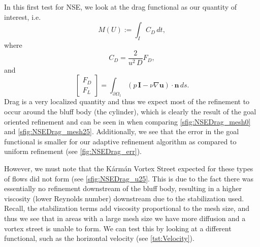 \begin{test} \label{tst:Drag}
    In this first test for NSE, we look at the drag functional as our quantity
    of interest, i.e.
    \begin{equation}
        M(U) := \int_I\! C_D\, dt,
        \label{eq:DragFunctional}
    \end{equation}
    where
    \begin{equation*}
        C_D = \frac{2}{u^2\, D}F_D,
    \end{equation*}
    and
    \begin{equation*}
        \begin{bmatrix} F_D \\ F_L \end{bmatrix} =
            \int_{\partial \Omega_1}\! (p\, \mathbf{I} - \nu \nabla
                \mathbf{u})\cdot \mathbf{n}\, ds.
    \end{equation*}
    Drag is a very localized quantity and thus we expect most of the refinement
    to occur around the bluff body (the cylinder), which is clearly the result
    of the goal oriented refinement and can be seen in when comparing
    \autoref{sfig:NSEDrag_mesh0} and \autoref{sfig:NSEDrag_mesh25}.
    Additionally, we see that the error in the goal functional is smaller for
    our adaptive refinement algorithm as compared to uniform refinement (see
    \autoref{fig:NSEDrag_err}).

    However, we must note that the K\'arm\'an Vortex Street expected for these
    types of flows did not form (see \autoref{sfig:NSEDrag_u25}. This is due to
    the fact there was essentially no refinement downstream of the bluff body,
    resulting in a higher viscosity (lower Reynolds number) downstream due to
    the stabilization used. Recall, the stabilization terms add viscosity
    proportional to the mesh size, and thus we see that in areas with a large
    mesh size we have more diffusion and a vortex street is unable to form. We
    can test this by looking at a different functional, such as the horizontal
    velocity (see \autoref{tst:Velocity}).


\end{test}
